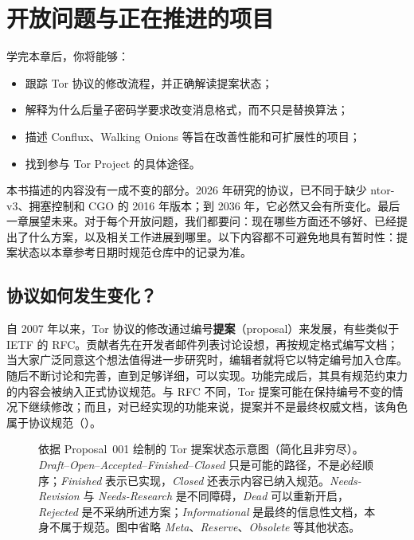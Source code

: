 \chapter{开放问题与正在推进的项目}\label{cap:31-futuro}

\begin{obiettivi}
学完本章后，你将能够：
\begin{itemize}[nosep]
  \item 跟踪 Tor 协议的修改流程，并正确解读提案状态；
  \item 解释为什么后量子密码学要求改变消息格式，而不只是替换算法；
  \item 描述 Conflux、Walking Onions 等旨在改善性能和可扩展性的项目；
  \item 找到参与 Tor Project 的具体途径。
\end{itemize}
\end{obiettivi}

本书描述的内容没有一成不变的部分。2026 年研究的协议，已不同于缺少 ntor-v3、拥塞控制和 CGO 的 2016 年版本；到 2036 年，它必然又会有所变化。最后一章展望未来。对于每个开放问题，我们都要问：现在哪些方面还不够好、已经提出了什么方案，以及相关工作进展到哪里。以下内容都不可避免地具有暂时性：提案状态以本章参考日期时规范仓库中的记录为准。

\section{协议如何发生变化？}\label{sec:fut-processo}

自 2007 年以来，Tor 协议的修改通过编号\textbf{提案}（proposal）来发展，有些类似于 IETF 的 RFC。贡献者先在开发者邮件列表讨论设想，再按规定格式编写文档；当大家广泛同意这个想法值得进一步研究时，编辑者就将它以特定编号加入仓库。随后不断讨论和完善，直到足够详细，可以实现。功能完成后，其具有规范约束力的内容会被纳入正式协议规范。与 RFC 不同，Tor 提案可能在保持编号不变的情况下继续修改；而且，对已经实现的功能来说，提案并不是最终权威文档，该角色属于协议规范（）。

\begin{figure}[htbp]
\centering

\caption{依据 Proposal~001 绘制的 Tor 提案状态示意图（简化且非穷尽）。\emph{Draft}--\emph{Open}--\emph{Accepted}--\emph{Finished}--\emph{Closed} 只是可能的路径，不是必经顺序；\emph{Finished} 表示已实现，\emph{Closed} 还表示内容已纳入规范。\emph{Needs-Revision} 与 \emph{Needs-Research} 是不同障碍，\emph{Dead} 可以重新开启，\emph{Rejected} 是不采纳所述方案；\emph{Informational} 是最终的信息性文档，本身不属于规范。图中省略 \emph{Meta}、\emph{Reserve}、\emph{Obsolete} 等其他状态。}
\label{fig:proposte}
\end{figure}

